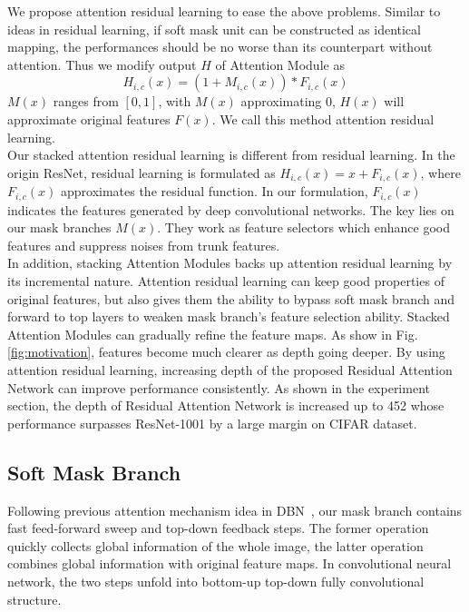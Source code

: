 \documentclass[10pt,twocolumn,letterpaper]{article}
\begin{document}
We propose attention residual learning to ease the above problems. Similar to ideas in residual learning, if soft mask unit can be constructed as identical mapping, the performances should be no worse than its counterpart without attention. Thus we modify output $H$ of Attention Module as
\begin{equation}
H_{i,c}(x)=(1+M_{i,c}(x))*F_{i,c}(x)
\end{equation}
$M(x)$ ranges from $[0,1]$, with $M(x)$ approximating 0, $H(x)$ will approximate original features $F(x)$. We call this method attention residual learning.
\\
\indent
Our stacked attention residual learning is different from residual learning. In the origin ResNet, residual learning is formulated as $H_{i,c}(x)= x + F_{i,c}(x)$, where $F_{i,c}(x)$ approximates the residual function. In our formulation, $F_{i,c}(x)$ indicates the features generated by deep convolutional networks. The key lies on our mask branches $M(x)$. They work as feature selectors which enhance good features and suppress noises from trunk features.
\\
\indent
In addition, stacking Attention Modules backs up attention residual learning by its incremental nature. Attention residual learning can keep good properties of original features, but also gives them the ability to bypass soft mask branch and forward to top layers to weaken mask branch's feature selection ability. Stacked Attention Modules can gradually refine the feature maps. As show in Fig.\ref{fig:motivation}, features become much clearer as depth going deeper. By using attention residual learning, increasing depth of the proposed Residual Attention Network can improve performance consistently. As shown in the experiment section, the depth of Residual Attention Network is increased up to 452 whose performance surpasses ResNet-1001 by a large margin on CIFAR dataset.

\subsection{Soft Mask Branch}
Following previous attention mechanism idea in DBN~\cite{larochelle2010learning}, our mask branch contains fast feed-forward sweep and top-down feedback steps. The former operation quickly collects global information of the whole image, the latter operation combines global information with original feature maps. In convolutional neural network, the two steps unfold into bottom-up top-down fully convolutional structure.
\end{document}
